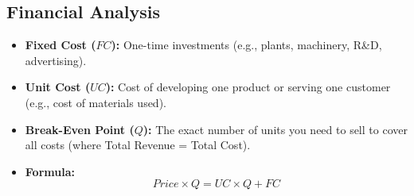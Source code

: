 \subsection*{Financial Analysis}
\begin{itemize}
    \item \textbf{Fixed Cost ($FC$):} One-time investments (e.g., plants, machinery, R\&D,
          advertising).
    \item \textbf{Unit Cost ($UC$):} Cost of developing one product or serving one customer
          (e.g., cost of materials used).
    \item \textbf{Break-Even Point ($Q$):} The exact number of units you need to sell to cover
          all costs (where Total Revenue = Total Cost).
    \item \textbf{Formula:} $$Price \times Q = UC \times Q + FC$$
\end{itemize}